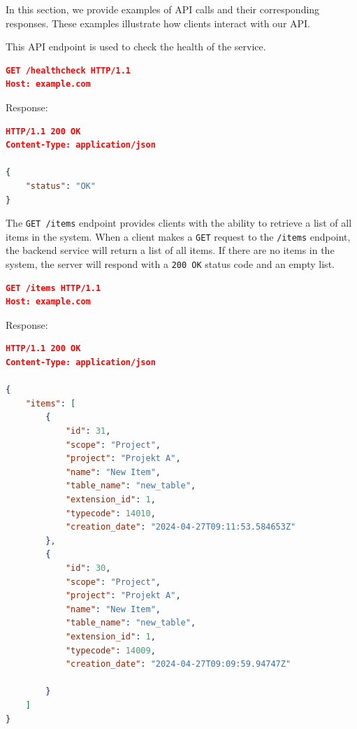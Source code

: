 \label{subsubsec:api-examples}

In this section, we provide examples of API calls and their corresponding responses.
These examples illustrate how clients interact with our API.


This API endpoint is used to check the health of the service.

\begin{lstlisting}[language=json,label={lst:lstlisting6}]
GET /healthcheck HTTP/1.1
Host: example.com
\end{lstlisting}

Response:

\begin{lstlisting}[language=json,label={lst:lstlisting4}]
HTTP/1.1 200 OK
Content-Type: application/json

{
    "status": "OK"
}
\end{lstlisting}


The \texttt{GET /items} endpoint provides clients with the ability to retrieve a list of all items in the system.
When a client makes a \texttt{GET} request to the \texttt{/items} endpoint, the backend service will return a list of all items.
If there are no items in the system, the server will respond with a \texttt{200 OK} status code and an empty list.

\begin{lstlisting}[language=json,label={lst:lstlisting3}]
GET /items HTTP/1.1
Host: example.com
\end{lstlisting}

Response:

\begin{lstlisting}[language=json,label={lst:lstlisting}]
HTTP/1.1 200 OK
Content-Type: application/json

{
    "items": [
        {
            "id": 31,
            "scope": "Project",
            "project": "Projekt A",
            "name": "New Item",
            "table_name": "new_table",
            "extension_id": 1,
            "typecode": 14010,
            "creation_date": "2024-04-27T09:11:53.584653Z"
        },
        {
            "id": 30,
            "scope": "Project",
            "project": "Projekt A",
            "name": "New Item",
            "table_name": "new_table",
            "extension_id": 1,
            "typecode": 14009,
            "creation_date": "2024-04-27T09:09:59.94747Z"

        }
    ]
}
\end{lstlisting}

